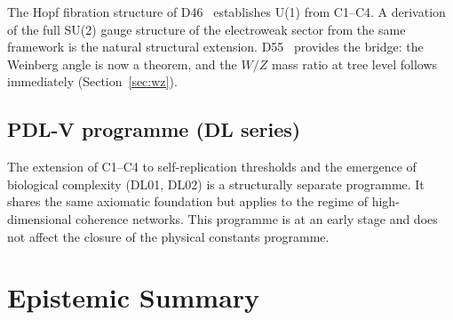 \documentclass[12pt,a4paper]{article}
\theoremstyle{definition}
\begin{document}
The Hopf fibration structure of D46~\cite{PDL_D46} establishes U(1) from C1--C4. A derivation of the full SU(2) gauge structure of the electroweak sector from the same framework is the natural structural extension. D55~\cite{PDL_D55} provides the bridge: the Weinberg angle is now a theorem, and the $W/Z$ mass ratio at tree level follows immediately (Section~\ref{sec:wz}).

\subsection{PDL-V programme (DL series)}

The extension of C1--C4 to self-replication thresholds and the emergence of biological complexity (DL01, DL02) is a structurally separate programme. It shares the same axiomatic foundation but applies to the regime of high-dimensional coherence networks. This programme is at an early stage and does not affect the closure of the physical constants programme.

\section{Epistemic Summary}
\label{sec:summary}
\end{document}
